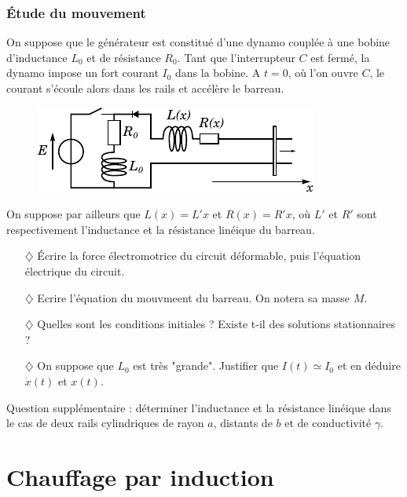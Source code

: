 \documentclass{report}
\begin{document}
\subsubsection*{Étude du mouvement}

On suppose que le générateur est constitué d'une dynamo couplée à une bobine d'inductance $L_0$ et de résistance $R_0$. Tant que l'interrupteur $C$ est fermé, la dynamo impose un fort courant $I_0$ dans la bobine. A $t=0$, où l'on ouvre $C$, le courant s'écoule alors dans les rails et accélère le barreau. 

\begin{figure}[h!]
\centering
		\includegraphics[scale=1]{induction2.pdf}
\end{figure}

On suppose par ailleurs que $L(x)=L'x$ et $R(x)=R'x$, où $L'$ et $R'$ sont respectivement l'inductance et la résistance linéique du barreau.

\begin{itemize}

	\item[$\diamondsuit$] Écrire la force électromotrice du circuit déformable, puis l'équation électrique du circuit. 
	
	\item[$\diamondsuit$] Ecrire l'équation du mouvmeent du barreau. On notera sa masse $M$. 
	
	\item[$\diamondsuit$] Quelles sont les conditions initiales ? Existe t-il des solutions stationnaires ?
	
	\item[$\diamondsuit$] On suppose que $L_0$ est très "grande". Justifier que $I(t)\simeq I_0$ et en déduire $\dot{x}(t)$ et $x(t)$.

\end{itemize}

Question supplémentaire : déterminer l'inductance et la résistance linéique dans le cas de deux rails cylindriques de rayon $a$, distants de $b$ et de conductivité $\gamma$.

\newpage

\section*{Chauffage par induction}
\end{document}
